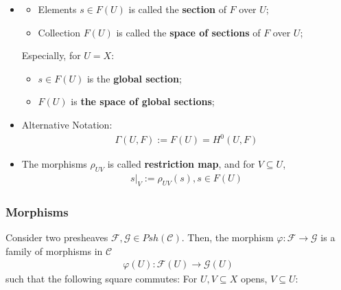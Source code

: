 \documentclass[Total.tex]{subfiles}
\begin{document}
				\begin{Def}
					\begin{itemize}
						\item \begin{itemize}
							\item Elements $s\in F(U)$ is called the \textbf{section} of $F$ over $U$; 
							\item Collection $F(U)$ is called the \textbf{space of sections} of $F$ over $U$;
						\end{itemize}
						Especially, for $U=X$:
						\begin{itemize}
							\item $s\in F(U)$ is the \textbf{global section};
							\item $F(U)$ is \textbf{the space of global sections};
						\end{itemize}
						\item Alternative Notation:
						\begin{gather*}
							\Gamma(U,F):=F(U)=H^0(U,F)
						\end{gather*}
						\item The morphisms $\rho_{UV}$ is called \textbf{restriction map}, and for $V\subseteq U$,
						\begin{gather*}
							s|_V:=\rho_{UV}(s),s\in F(U)
						\end{gather*}
					\end{itemize}
				\end{Def}
				\subsubsection{Morphisms}
					\begin{Def}
						Consider two presheaves $\mathcal{F},\mathcal{G}\in Psh(\mathcal{C})$. Then, the morphism $\varphi:\mathcal{F}\rightarrow \mathcal{G}$ is a family of morphisms in $\mathcal{C}$
						\begin{gather*}
							\varphi(U):\mathcal{F}(U)\rightarrow \mathcal{G}(U)
						\end{gather*}
						such that the following square commutes: For $U,V\subseteq X$ opens, $V\subseteq U$:
						\begin{center}
						\end{center}
					\end{Def}
\end{document}
